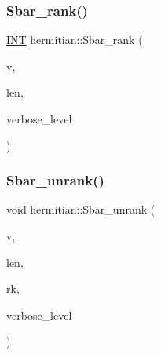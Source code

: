 \mbox{\label{classhermitian_a5ef2f95dc64a0d5797c324badd615eef}} 
\subsubsection{\texorpdfstring{Sbar\+\_\+rank()}{Sbar\_rank()}}
{\footnotesize\ttfamily \mbox{\hyperlink{galois_8h_a09fddde158a3a20bd2dcadb609de11dc}{I\+NT}} hermitian\+::\+Sbar\+\_\+rank (\begin{DoxyParamCaption}\item[{\mbox{\hyperlink{galois_8h_a09fddde158a3a20bd2dcadb609de11dc}{I\+NT}} $\ast$}]{v,  }\item[{\mbox{\hyperlink{galois_8h_a09fddde158a3a20bd2dcadb609de11dc}{I\+NT}}}]{len,  }\item[{\mbox{\hyperlink{galois_8h_a09fddde158a3a20bd2dcadb609de11dc}{I\+NT}}}]{verbose\+\_\+level }\end{DoxyParamCaption})}

\mbox{\label{classhermitian_a19630659be24378fa4aa97f23d19bc3d}} 
\subsubsection{\texorpdfstring{Sbar\+\_\+unrank()}{Sbar\_unrank()}}
{\footnotesize\ttfamily void hermitian\+::\+Sbar\+\_\+unrank (\begin{DoxyParamCaption}\item[{\mbox{\hyperlink{galois_8h_a09fddde158a3a20bd2dcadb609de11dc}{I\+NT}} $\ast$}]{v,  }\item[{\mbox{\hyperlink{galois_8h_a09fddde158a3a20bd2dcadb609de11dc}{I\+NT}}}]{len,  }\item[{\mbox{\hyperlink{galois_8h_a09fddde158a3a20bd2dcadb609de11dc}{I\+NT}}}]{rk,  }\item[{\mbox{\hyperlink{galois_8h_a09fddde158a3a20bd2dcadb609de11dc}{I\+NT}}}]{verbose\+\_\+level }\end{DoxyParamCaption})}

\mbox{\label{classhermitian_a566d94eb39bb2408a88b4924b3565b17}} 
